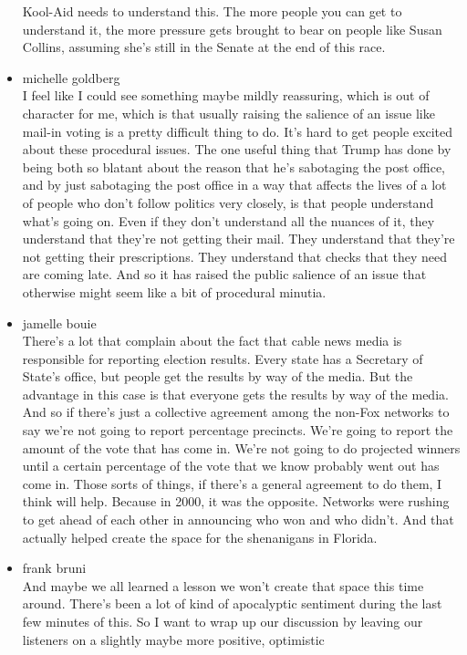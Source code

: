 \begin{itemize}
  Kool-Aid needs to understand this. The more people you can get to
  understand it, the more pressure gets brought to bear on people like
  Susan Collins, assuming she's still in the Senate at the end of this
  race.
\item
  michelle goldberg\\
  I feel like I could see something maybe mildly reassuring, which is
  out of character for me, which is that usually raising the salience of
  an issue like mail-in voting is a pretty difficult thing to do. It's
  hard to get people excited about these procedural issues. The one
  useful thing that Trump has done by being both so blatant about the
  reason that he's sabotaging the post office, and by just sabotaging
  the post office in a way that affects the lives of a lot of people who
  don't follow politics very closely, is that people understand what's
  going on. Even if they don't understand all the nuances of it, they
  understand that they're not getting their mail. They understand that
  they're not getting their prescriptions. They understand that checks
  that they need are coming late. And so it has raised the public
  salience of an issue that otherwise might seem like a bit of
  procedural minutia.
\item
  jamelle bouie\\
  There's a lot that complain about the fact that cable news media is
  responsible for reporting election results. Every state has a
  Secretary of State's office, but people get the results by way of the
  media. But the advantage in this case is that everyone gets the
  results by way of the media. And so if there's just a collective
  agreement among the non-Fox networks to say we're not going to report
  percentage precincts. We're going to report the amount of the vote
  that has come in. We're not going to do projected winners until a
  certain percentage of the vote that we know probably went out has come
  in. Those sorts of things, if there's a general agreement to do them,
  I think will help. Because in 2000, it was the opposite. Networks were
  rushing to get ahead of each other in announcing who won and who
  didn't. And that actually helped create the space for the shenanigans
  in Florida.
\item
  frank bruni\\
  And maybe we all learned a lesson we won't create that space this time
  around. There's been a lot of kind of apocalyptic sentiment during the
  last few minutes of this. So I want to wrap up our discussion by
  leaving our listeners on a slightly maybe more positive, optimistic

\end{itemize}
